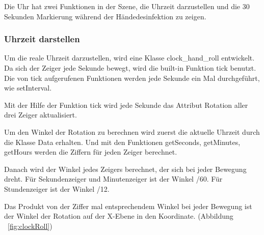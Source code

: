  Die Uhr hat zwei Funktionen in der Szene, die Uhrzeit darzustellen und die 30 Sekunden Markierung während der Händedesinfektion zu zeigen.
 
 \subsubsection{Uhrzeit darstellen}
 
 Um die reale Uhrzeit darzustellen, wird eine Klasse {\selectfont clock\_hand\_roll} entwickelt. Da sich der Zeiger jede Sekunde bewegt, wird die built-in Funktion {\selectfont tick} benutzt. Die von {\selectfont tick} aufgerufenen Funktionen werden jede Sekunde ein Mal durchgeführt, wie {\selectfont setInterval}.
 
 Mit der Hilfe der Funktion {\selectfont tick} wird jede Sekunde das Attribut {\selectfont Rotation} aller drei Zeiger aktualisiert. 
 
 Um den Winkel der Rotation zu berechnen wird zuerst die aktuelle Uhrzeit durch die Klasse {\selectfont Data} erhalten. Und mit den Funktionen {\selectfont getSeconds}, {\selectfont getMinutes}, {\selectfont getHours} werden die Ziffern für jeden Zeiger berechnet.
 
 Danach wird der Winkel jedes Zeigers berechnet, der sich bei jeder Bewegung dreht. Für Sekundenzeiger und Minutenzeiger ist der Winkel {/60}. Für Stundenzeiger ist der Winkel {/12}.
 
 Das Produkt von der Ziffer mal entsprechendem Winkel bei jeder Bewegung ist der Winkel der Rotation auf der X-Ebene in den Koordinate. (Abbildung ~\ref{fig:clockRoll})
 
